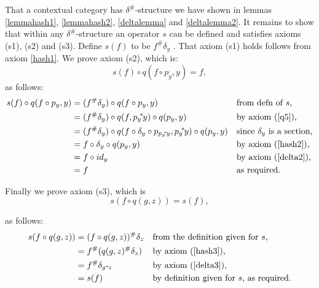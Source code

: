 \documentclass[10pt,a4paper]{scrartcl}
\newcommand{\ssub}{\kern-2pt^*\kern-1pt}
\renewcommand{\sub}{^*\kern-1pt}
\newcommand{\hash}{^\#}
\newcommand{\byaxiom}[1]{by axiom (\ref{#1})}
\begin{document}
That a contextual category has $\delta\hash$-structure we have shown in lemmas \ref{lemmahash1}, \ref{lemmahash2},
\ref{deltalemma} and \ref{deltalemma2}.
It remains to show that within any $\delta\hash$-structure an operator $s$ can be defined and satisfies axioms (s1), (s2) and (s3).
\noindent
Define $s(f)$ to be $f \hash\delta_y$ . 
\noindent
That axiom (s1) holds follows from axiom \ref{hash1}.
\noindent
We prove axiom (s2), which is:
\begin{equation*}
s(f) \circ q( f \circ p_y ,y)=f,
\end{equation*}
\noindent
 as follows:
\begin{align*}
s(f) \circ q( f \circ p_y ,y)
 &= (f \hash \delta_y) \circ q(f \circ p_y, y)                                                  && \mbox{from defn of $s$,} \\
 &= (f \hash \delta_y) \circ q(f,{p_y} \ssub y) \circ q(p_y,y)                                  && \mbox{\byaxiom{q5},} \\
 &= (f \hash \delta_y) \circ q(f \circ \delta_y \circ p_{{p_y} \ssub y},{p_y} \ssub y) \circ q(p_y,y) 
                                                                                                && \mbox{since $\delta_y$ is a section,} \\
 &= f \circ \delta_y \circ q(p_y,y)                                                             && \mbox{\byaxiom{hash2},} \\
 &= f \circ id_y                                                                                && \mbox{\byaxiom{delta2},} \\
 &= f                                                                                           && \mbox{as required.}
\end{align*}

\noindent
Finally we prove axiom (s3), which is
\begin{equation*}
s(f \circ q(g,z))=s(f),
\end{equation*}

\noindent
 as follows:
\begin{align*}
s(f \circ q(g,z)) &= (f \circ q(g,z)) \hash \delta_z      && \mbox{from the definition given for $s$,} \\
                  &= f \hash (  q(g,z) \hash \delta_z)    &&\mbox{\byaxiom{hash3},} \\
                  &= f \hash \delta_{g \sub z}            && \mbox{\byaxiom{delta3},} \\
	              &= s(f)                                 && \mbox{by definition given for $s$, as required.}
\end{align*}
\fi

 
\end{document}
